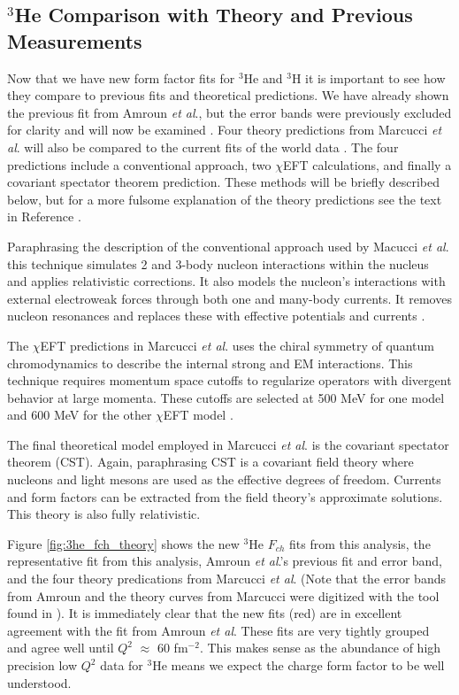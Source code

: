 \subsection{$^3$He Comparison with Theory and Previous Measurements}
\label{ssec:3he_comparison_with_theory}

Now that we have new form factor fits for $^3$He and $^3$H it is important to see how they compare to previous fits and theoretical predictions. We have already shown the previous fit from Amroun \textit{et al}., but the error bands were previously excluded for clarity and will now be examined \cite{Article:Amroun}. Four theory predictions from Marcucci \textit{et al}. will also be compared to the current fits of the world data \cite{Article:Marcucci}. The four predictions include a conventional approach, two $\chi$EFT calculations, and finally a covariant spectator theorem prediction. These methods will be briefly described below, but for a more fulsome explanation of the theory predictions see the text in Reference \cite{Article:Marcucci}.

Paraphrasing the description of the conventional approach used by Macucci \textit{et al}. this technique simulates 2 and 3-body nucleon interactions within the nucleus and applies relativistic corrections. It also models the nucleon's interactions with external electroweak forces through both one and many-body currents. It removes nucleon resonances and replaces these with effective potentials and currents \cite{Article:Marcucci}.

The $\chi$EFT predictions in Marcucci \textit{et al}. uses the chiral symmetry of quantum chromodynamics to describe the internal strong and EM interactions. This technique requires momentum space cutoffs to regularize operators with divergent behavior at large momenta. These cutoffs are selected at 500 MeV for one model and 600 MeV for the other $\chi$EFT model \cite{Article:Marcucci}.

The final theoretical model employed in Marcucci \textit{et al}. is the covariant spectator theorem (CST). Again, paraphrasing \cite{Article:Marcucci} CST is a covariant field theory where nucleons and light mesons are used as the effective degrees of freedom. Currents and form factors can be extracted from the field theory's approximate solutions. This theory is also fully relativistic.

Figure \ref{fig:3he_fch_theory} shows the new $^3$He $F_{ch}$ fits from this analysis, the representative fit from this analysis, Amroun \textit{et al}.'s previous fit and error band, and the four theory predications from Marcucci \textit{et al}. (Note that the error bands from Amroun and the theory curves from Marcucci were digitized with the tool found in \cite{web_plot_digitizer}). It is immediately clear that the new fits (red) are in excellent agreement with the fit from Amroun \textit{et al}. These fits are very tightly grouped and agree well until $Q^2$ $\approx$ 60 fm$^{-2}$. This makes sense as the abundance of high precision low $Q^2$ data for $^3$He means we expect the charge form factor to be well understood. 


